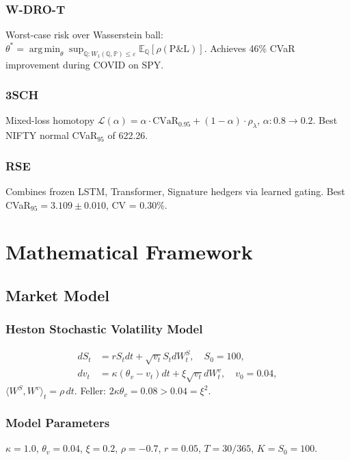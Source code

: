 \documentclass[11pt]{article}
\newcommand{\E}{\mathbb{E}}
\newcommand{\PP}{\mathbb{P}}
\newcommand{\QQ}{\mathbb{Q}}
\newcommand{\cvar}{\mathrm{CVaR}}
\DeclareMathOperator*{\argmin}{arg\,min}
\begin{document}
\subsubsection{W-DRO-T} Worst-case risk over Wasserstein ball: $\theta^* = \argmin_\theta \sup_{\QQ: W_1(\QQ,\PP) \leq \varepsilon} \E_\QQ[\rho(\mathrm{P\&L})]$. Achieves 46\% CVaR improvement during COVID on SPY.

\subsubsection{3SCH} Mixed-loss homotopy $\mathcal{L}(\alpha) = \alpha\cdot\cvar_{0.95} + (1{-}\alpha)\cdot\rho_\lambda$, $\alpha: 0.8\to0.2$. Best NIFTY normal CVaR$_{95}$ of 622.26.

\subsubsection{RSE} Combines frozen LSTM, Transformer, Signature hedgers via learned gating. Best CVaR$_{95} = 3.109 \pm 0.010$, CV = 0.30\%.

\section{Mathematical Framework}

\subsection{Market Model}
\subsubsection{Heston Stochastic Volatility Model}
\begin{align}
dS_t &= r S_t dt + \sqrt{v_t} S_t dW_t^S, \quad S_0 = 100,\\
dv_t &= \kappa(\theta_v - v_t) dt + \xi \sqrt{v_t} dW_t^v, \quad v_0 = 0.04,
\end{align}
$\langle W^S, W^v \rangle_t = \rho\,dt$. Feller: $2\kappa\theta_v = 0.08 > 0.04 = \xi^2$.

\subsubsection{Model Parameters}
$\kappa{=}1.0$, $\theta_v{=}0.04$, $\xi{=}0.2$, $\rho{=}{-}0.7$, $r{=}0.05$, $T{=}30/365$, $K{=}S_0{=}100$.
\end{document}
